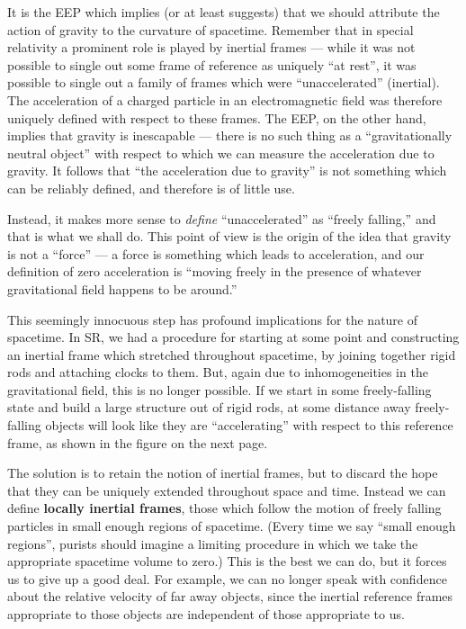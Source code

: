 It is the EEP which implies (or at least suggests) that we should
attribute the action of gravity to the curvature of spacetime.  
Remember that in special relativity a prominent role is played by
inertial frames --- while it was not possible to single out some
frame of reference as uniquely ``at rest'', it was possible to single
out a family of frames which were ``unaccelerated'' (inertial).
The acceleration of a charged particle in an electromagnetic field
was therefore uniquely defined with respect to these frames.  The
EEP, on the other hand, implies that gravity is inescapable --- there
is no such thing as a ``gravitationally neutral object'' with respect 
to which we can measure the acceleration due to gravity.  It follows
that ``the acceleration due to gravity'' is not something which can
be reliably defined, and therefore is of little use.  

Instead, it makes more sense to {\it define} ``unaccelerated'' as
``freely falling,'' and that is what we shall do.  This point of 
view is the origin of the idea that gravity is not a ``force'' ---
a force is something which leads to acceleration, and our definition
of zero acceleration is ``moving freely in the presence of whatever
gravitational field happens to be around.''

This seemingly innocuous step has profound implications for the nature
of spacetime.  In SR, we had a procedure for starting at some point
and constructing an inertial frame which stretched throughout spacetime,
by joining together rigid rods and attaching clocks to them.  But, again
due to inhomogeneities in the gravitational field, this is no longer 
possible.  If we start in some freely-falling state and build a large
structure out of rigid rods, at some distance away freely-falling
objects will look like they are ``accelerating'' with respect to this
reference frame, as shown in the figure on the next page.

\eject

\begin{figure}
  \centerline{
  }
\end{figure}

The solution is to retain the notion of inertial frames, but to 
discard the hope that they can be uniquely extended throughout space
and time.  Instead we can define {\bf locally inertial frames}, those
which follow the motion of freely falling particles in small enough
regions of spacetime.  (Every time we say ``small enough regions'',
purists should imagine a limiting procedure in which we take the appropriate
spacetime volume to zero.)  This is the best we can do, but it forces
us to give up a good deal.  For example, we can no longer speak with
confidence about the relative velocity of far away objects, since the
inertial reference frames appropriate to those objects are independent
of those appropriate to us.

